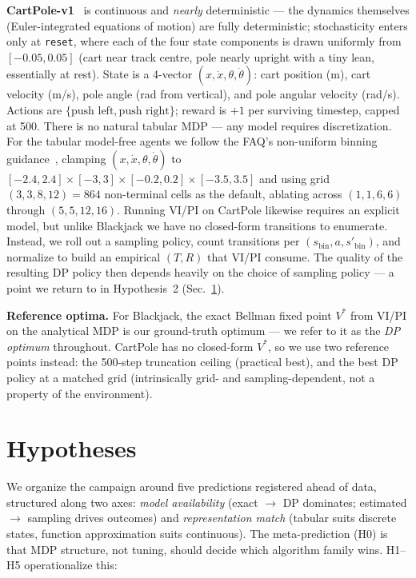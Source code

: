 \documentclass[conference]{IEEEtran}
\begin{document}
\textbf{CartPole-v1}~\cite{barto1983, gym_cartpole} is continuous and
\emph{nearly} deterministic --- the dynamics themselves (Euler-integrated
equations of motion) are fully deterministic; stochasticity enters only at
\texttt{reset}, where each of the four state components is drawn uniformly
from $[-0.05, 0.05]$ (cart near track centre, pole nearly upright with a
tiny lean, essentially at rest). State is a 4-vector $(x, \dot{x}, \theta,
\dot\theta)$: cart position (m), cart velocity (m/s), pole angle (rad from
vertical), and pole angular velocity (rad/s). Actions are $\{\text{push
left}, \text{push right}\}$; reward is $+1$ per surviving timestep, capped
at 500. There is no natural tabular MDP --- any model requires
discretization. For the tabular model-free agents we follow the FAQ's
non-uniform binning guidance~\cite{cartpole_faq}, clamping $(x, \dot{x},
\theta, \dot\theta)$ to $[-2.4, 2.4] \times [-3, 3] \times [-0.2, 0.2]
\times [-3.5, 3.5]$ and using grid $(3, 3, 8, 12) = 864$ non-terminal cells
as the default, ablating across $(1,1,6,6)$ through $(5,5,12,16)$.
Running VI/PI on CartPole likewise requires an explicit model, but unlike
Blackjack we have no closed-form transitions to enumerate. Instead, we
roll out a sampling policy, count transitions per $(s_{\text{bin}}, a,
s'_{\text{bin}})$, and normalize to build an empirical $(T, R)$ that
VI/PI consume. The quality of the resulting DP policy then depends heavily
on the choice of sampling policy --- a point we return to in
Hypothesis~2 (Sec.~\ref{sec:hypotheses}).

\textbf{Reference optima.} For Blackjack, the exact Bellman fixed
point $V^*$ from VI/PI on the analytical MDP is our ground-truth
optimum --- we refer to it as the \emph{DP optimum} throughout.
CartPole has no closed-form $V^*$, so we use two reference points
instead: the 500-step truncation ceiling (practical best), and the
best DP policy at a matched grid (intrinsically grid- and
sampling-dependent, not a property of the environment).


\section{Hypotheses}
\label{sec:hypotheses}

We organize the campaign around five predictions registered
ahead of data, structured along two axes: \emph{model
availability} (exact $\to$ DP dominates; estimated $\to$
sampling drives outcomes) and \emph{representation match}
(tabular suits discrete states, function approximation suits
continuous). The meta-prediction (H0) is that MDP structure,
not tuning, should decide which algorithm family wins.
H1--H5 operationalize this:
\end{document}

